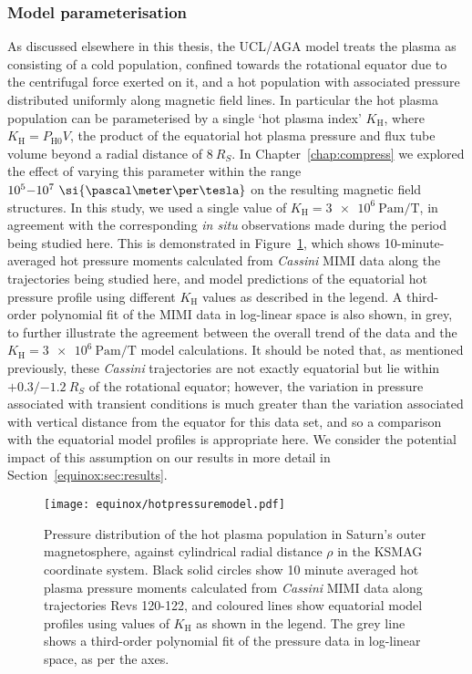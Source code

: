 \subsubsection{Model parameterisation}\label{equinox:sec:modelparamzation}
As discussed elsewhere in this thesis, the UCL/AGA model treats the plasma as consisting of a cold population, confined towards the rotational equator due to the centrifugal force exerted on it, and a hot population with associated pressure distributed uniformly along magnetic field lines. In particular the hot plasma population can  be  parameterised by a single `hot plasma index' $ K_\mathrm{H}$, where $ K_\mathrm{H}= P_\mathrm{H0}V$, the product of the equatorial hot  plasma pressure  and flux tube volume beyond a radial distance of $\SI{8}{R_S}$. In Chapter~\ref{chap:compress} we explored the effect of varying this parameter within the range $10^5{\--}10^7~\si{\pascal\meter\per\tesla}$ on the resulting magnetic field structures. In this study, we used a single value of $K_\mathrm{H} = \SI{3e6}{\pascal\m\per\tesla}$, in agreement with the corresponding \textit{in situ} observations made during the period being studied here. This is demonstrated in Figure~\ref{equinox:fig:hotpressuremodel}, which shows 10-minute-averaged hot pressure moments calculated from \textit{Cassini} MIMI data along the trajectories being studied here, and model predictions of the equatorial hot pressure profile using different $K_\mathrm{H}$ values as described in the legend. A third-order polynomial fit of the MIMI data in log-linear space is also shown, in grey, to further illustrate the agreement between the overall trend of the data and the $K_\mathrm{H} = \SI{3e6}{\pascal\m\per\tesla}$ model calculations. It should be noted that, as mentioned previously, these \textit{Cassini} trajectories are not exactly equatorial but lie within $+0.3/\SI{-1.2}{R_S}$ of the rotational equator; however, the variation in pressure associated with transient conditions is much greater than the variation associated with vertical distance from the equator for this data set, and so a comparison with the equatorial model profiles is appropriate here. We consider the potential impact of this assumption on our results in more detail in Section~\ref{equinox:sec:results}.
\begin{figure}
\centering
\texttt{[image: equinox/hotpressuremodel.pdf]}
\caption[Equatorial hot plasma pressure from \textit{Cassini} MIMI, and model predictions for different $K_\mathrm{H}$ values.]{Pressure distribution of the hot plasma population in Saturn's outer magnetosphere, against cylindrical radial distance $\rho$ in the KSMAG coordinate system. Black solid circles show 10 minute averaged hot plasma pressure moments calculated from \textit{Cassini} MIMI data along trajectories Revs 120-122, and coloured lines show equatorial model profiles using values of $K_\mathrm{H}$ as shown in the legend. The grey line shows a third-order polynomial fit of the pressure data in log-linear space, as per the axes.}
\label{equinox:fig:hotpressuremodel}
\end{figure}

